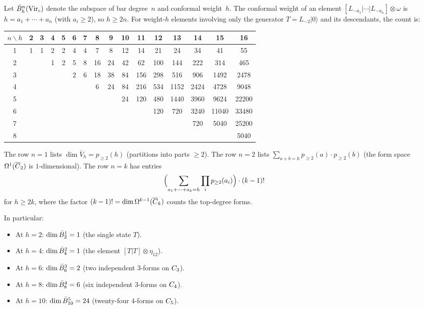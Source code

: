 \begin{computation}
\label{comp:virasoro-dim-table}
Let $\bar{B}^n_h(\mathrm{Vir}_c)$ denote the subspace of bar degree~$n$
and conformal weight~$h$.  The conformal weight of an element
$[L_{-a_1}| \cdots |L_{-a_n}] \otimes \omega$ is
$h = a_1 + \cdots + a_n$ (with $a_i \geq 2$), so
$h \geq 2n$.  For weight-$h$ elements involving only the
generator $T = L_{-2}|0\rangle$ and its descendants, the count is:
\begin{center}
\renewcommand{\arraystretch}{1.15}
{\small
\begin{tabular}{c|ccccccccccccccc}
$n \backslash h$ & 2 & 3 & 4 & 5 & 6 & 7 & 8 & 9 & 10 & 11 & 12 & 13 & 14 & 15 & 16 \\
\hline
1 & 1 & 1 & 2 & 2 & 4 & 4 & 7 & 8 & 12 & 14 & 21 & 24 & 34 & 41 & 55 \\
2 & & & 1 & 2 & 5 & 8 & 16 & 24 & 42 & 62 & 100 & 144 & 222 & 314 & 465 \\
3 & & & & & 2 & 6 & 18 & 38 & 84 & 156 & 298 & 516 & 906 & 1492 & 2478 \\
4 & & & & & & & 6 & 24 & 84 & 216 & 534 & 1152 & 2424 & 4728 & 9048 \\
5 & & & & & & & & & 24 & 120 & 480 & 1440 & 3960 & 9624 & 22200 \\
6 & & & & & & & & & & & 120 & 720 & 3240 & 11040 & 33480 \\
7 & & & & & & & & & & & & & 720 & 5040 & 25200 \\
8 & & & & & & & & & & & & & & & 5040
\end{tabular}
}
\end{center}
The row $n = 1$ lists $\dim \bar{V}_h = p_{\geq 2}(h)$
(partitions into parts $\geq 2$).  The row $n = 2$ lists
$\sum_{a+b=h} p_{\geq 2}(a) \cdot p_{\geq 2}(b)$
(the form space $\Omega^1(\overline{C}_2)$ is
$1$-dimensional).
The row $n = k$ has entries
\[
\Bigl(\sum_{a_1 + \cdots + a_k = h}
\prod_i p_{\geq 2}(a_i)\Bigr) \cdot (k-1)!
\]
for $h \geq 2k$, where the factor
$(k-1)! = \dim \Omega^{k-1}(\overline{C}_k)$
counts the top-degree forms.

In particular:
\begin{itemize}
\item At $h = 2$: $\dim \bar{B}^1_2 = 1$ (the single state $T$).
\item At $h = 4$: $\dim \bar{B}^2_4 = 1$ (the element $[T|T] \otimes \eta_{12}$).
\item At $h = 6$: $\dim \bar{B}^3_6 = 2$ (two independent $3$-forms on $C_3$).
\item At $h = 8$: $\dim \bar{B}^4_8 = 6$ (six independent $3$-forms on $C_4$).
\item At $h = 10$: $\dim \bar{B}^5_{10} = 24$ (twenty-four $4$-forms on $C_5$).
\end{itemize}
\end{computation}

